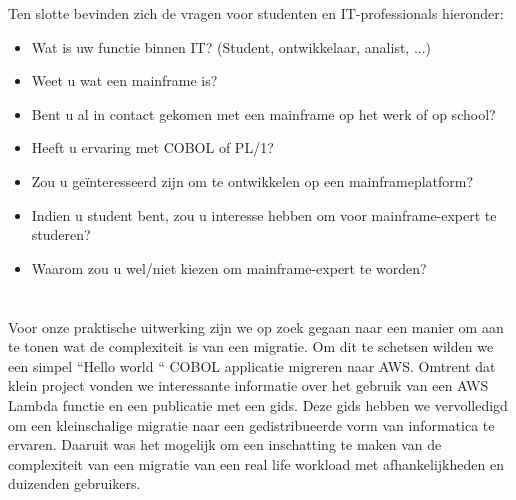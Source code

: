 Ten slotte bevinden zich de vragen voor studenten en IT-professionals hieronder:
 \begin{itemize}
    \item Wat is uw functie binnen IT? (Student, ontwikkelaar, analist, ...)
    \item Weet u wat een mainframe is?
    \item Bent u al in contact gekomen met een mainframe op het werk of op school?
    \item Heeft u ervaring met COBOL of PL/1?
    \item Zou u geïnteresseerd zijn om te ontwikkelen op een mainframeplatform?
    \item Indien u student bent, zou u interesse hebben om voor mainframe-expert te studeren?
    \item Waarom zou u wel/niet kiezen om mainframe-expert te worden?
\end{itemize}



\section{}
\label{sec:De praktische uitwerking}

Voor onze praktische uitwerking zijn we op zoek gegaan naar een manier om aan te tonen wat de complexiteit is van een migratie. Om dit te schetsen wilden we een simpel ``Hello world `` COBOL applicatie migreren naar AWS. Omtrent dat klein project vonden we interessante informatie over het gebruik van een AWS Lambda functie en een publicatie met een gids. Deze gids hebben we vervolledigd om een kleinschalige migratie naar een gedistribueerde vorm van informatica te ervaren. Daaruit was het mogelijk om een inschatting te maken van de complexiteit van een migratie van een real life workload met afhankelijkheden en duizenden gebruikers.
